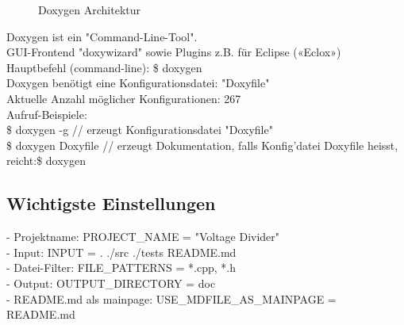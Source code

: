 \begin{figure}[ht]
	\centering
	\caption[]{Doxygen Architektur}
\end{figure}

Doxygen ist ein "Command-Line-Tool". \\
GUI-Frontend "doxywizard" sowie Plugins z.B. für Eclipse («Eclox») \\
Hauptbefehl (command-line): \$ doxygen \\
Doxygen benötigt eine Konfigurationsdatei: "Doxyfile" \\
Aktuelle Anzahl möglicher Konfigurationen: 267 \\ 
Aufruf-Beispiele: \\
\$ doxygen -g     // erzeugt Konfigurationsdatei "Doxyfile" \\
\$ doxygen Doxyfile // erzeugt Dokumentation, falls Konfig'datei Doxyfile heisst, reicht:\$ doxygen

\subsection{Wichtigste Einstellungen}
- Projektname: PROJECT\_NAME = "Voltage Divider" \\
- Input: INPUT = . ./src ./tests README.md \\
- Datei-Filter: FILE\_PATTERNS = *.cpp, *.h \\
- Output: OUTPUT\_DIRECTORY = doc \\
- README.md als mainpage: USE\_MDFILE\_AS\_MAINPAGE = README.md \\

